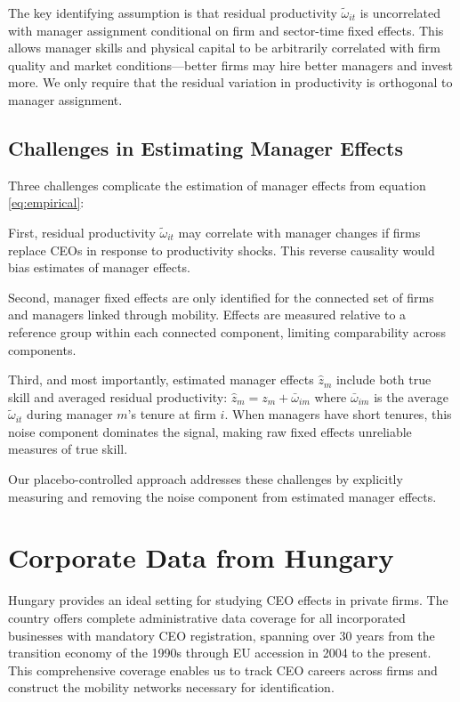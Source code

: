 \documentclass[11pt,a4paper]{article}
\begin{document}
The key identifying assumption is that residual productivity $\tilde{\omega}_{it}$ is uncorrelated with manager assignment conditional on firm and sector-time fixed effects. This allows manager skills and physical capital to be arbitrarily correlated with firm quality and market conditions—better firms may hire better managers and invest more. We only require that the residual variation in productivity is orthogonal to manager assignment.

\subsection{Challenges in Estimating Manager Effects}

Three challenges complicate the estimation of manager effects from equation \eqref{eq:empirical}:

First, residual productivity $\tilde{\omega}_{it}$ may correlate with manager changes if firms replace CEOs in response to productivity shocks. This reverse causality would bias estimates of manager effects.

Second, manager fixed effects are only identified for the connected set of firms and managers linked through mobility. Effects are measured relative to a reference group within each connected component, limiting comparability across components.

Third, and most importantly, estimated manager effects $\hat{z}_m$ include both true skill and averaged residual productivity: $\hat{z}_m = z_m + \bar{\omega}_{im}$ where $\bar{\omega}_{im}$ is the average $\tilde{\omega}_{it}$ during manager $m$'s tenure at firm $i$. When managers have short tenures, this noise component dominates the signal, making raw fixed effects unreliable measures of true skill.

Our placebo-controlled approach addresses these challenges by explicitly measuring and removing the noise component from estimated manager effects.

\section{Corporate Data from Hungary}

Hungary provides an ideal setting for studying CEO effects in private firms. The country offers complete administrative data coverage for all incorporated businesses with mandatory CEO registration, spanning over 30 years from the transition economy of the 1990s through EU accession in 2004 to the present. This comprehensive coverage enables us to track CEO careers across firms and construct the mobility networks necessary for identification.
\end{document}
